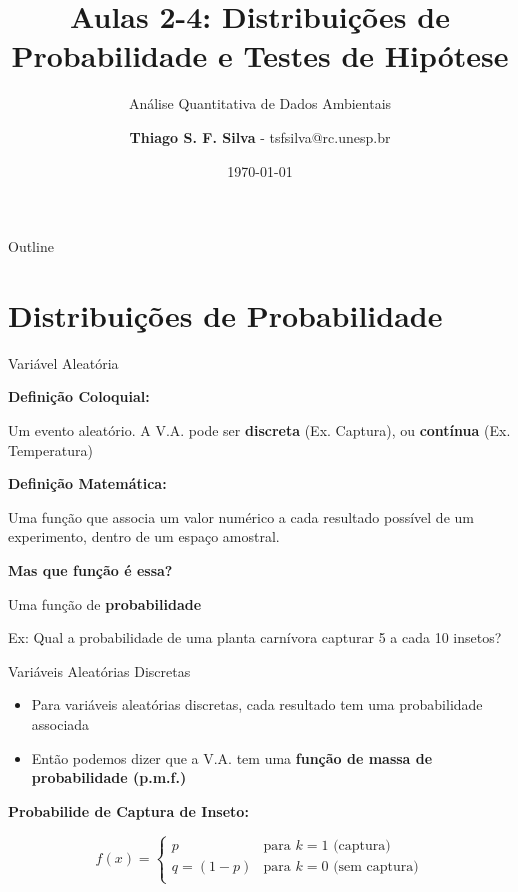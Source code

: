 \documentclass{beamer}\usepackage[]{graphicx}\usepackage[]{color}
\title{Aulas 2-4: Distribuições de Probabilidade e Testes de Hipótese}
\subtitle{Análise Quantitativa de Dados Ambientais}
\author{\textbf{Thiago S. F. Silva} - tsfsilva@rc.unesp.br}
\institute{Programa de Pós Graduação em Geografia - IGCE/UNESP}
\date{\today}
\begin{document}
\begin{frame}[plain] %
  \titlepage
\end{frame}

\begin{frame}{Outline}
  \tableofcontents
\end{frame}

\section{Distribuições de Probabilidade}

\begin{frame}{Variável Aleatória}

\textbf{Definição Coloquial:}

Um evento aleatório. A V.A. pode ser \textbf{discreta} (Ex. Captura), ou \textbf{contínua} (Ex. Temperatura)

\vfill

\textbf{Definição Matemática:}

Uma função que associa um valor numérico a cada resultado possível de um experimento, dentro de um espaço amostral.

\vfill

\textbf{Mas que função é essa? }\pause

Uma função de \textbf{probabilidade}

Ex: Qual a probabilidade de uma planta carnívora capturar 5 a cada 10 insetos?


\end{frame} 


\begin{frame}{Variáveis Aleatórias Discretas}

\begin{itemize}
  \item Para variáveis aleatórias discretas, cada resultado tem uma probabilidade associada
  \item Então podemos dizer que a V.A. tem uma \textbf{função de massa de probabilidade (p.m.f.)}
\end{itemize}
  
\vfill  
  
\textbf{Probabilide de Captura de Inseto:}
  
$$
f(x) = 
  \begin{cases}
    p & \text{para } k=1  \text{ (captura)}\\
    q = (1-p) & \text{para } k= 0 \text{ (sem captura)}\\
  \end{cases}
$$

\end{frame} 
\end{document}
